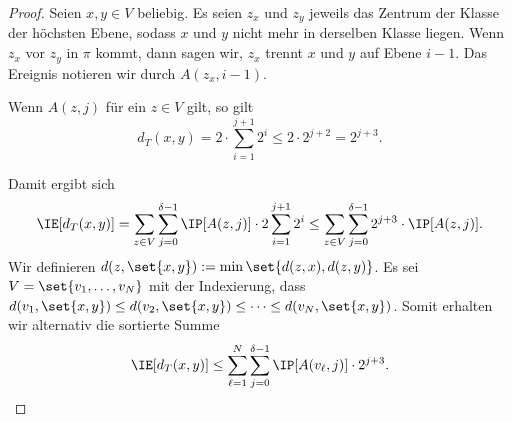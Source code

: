 \documentclass[language=ngerman,algolist]{TemplateLecture}
\begin{document}
\begin{proof}
    Seien $x, y \in V$ beliebig. Es seien $z_x$ und $z_y$ jeweils das Zentrum der Klasse der höchsten Ebene, sodass $x$ und $y$ nicht mehr in derselben Klasse liegen. Wenn $z_x$ vor $z_y$ in $\pi$ kommt, dann sagen wir, $z_x$ trennt $x$ und $y$ auf Ebene $i-1$. Das Ereignis notieren wir durch $A(z_x, i-1)$.

    Wenn $A(z, j)$ für ein $z \in V$ gilt, so gilt 
    \begin{equation*}
        d_T(x,y) = 2 \cdot \sum_{i = 1}^{j + 1} 2^i \leq 2 \cdot 2^{j+2} = 2^{j + 3}.
    \end{equation*}

    Damit ergibt sich 
    \begin{equation}
        \IE[d_T(x,y)] = \sum_{z \in V} \sum_{j = 0}^{\delta - 1} \IP[A(z, j)] \cdot 2\sum_{i = 1}^{j + 1} 2^i \leq \sum_{z \in V}\sum_{j = 0}^{\delta - 1}2^{j+3} \cdot \IP[A(z,j)]. \label{eq:hierPartFactor1}
    \end{equation}
    Wir definieren $d(z, \set{x,y}) := \min\set{d(z,x), d(z,y)}$. Es sei $V = \set{v_1, \ldots, v_N}$ mit der Indexierung, dass $d(v_1, \set{x,y}) \leq d(v_2, \set{x,y}) \leq \cdots \leq d(v_N, \set{x,y})$. Somit erhalten wir alternativ die sortierte Summe 
    \begin{equation}
        \IE[d_T(x,y)] \leq \sum_{\ell = 1}^N \sum_{j = 0}^{\delta - 1} \IP[A(v_\ell, j)] \cdot 2^{j+3}. \label{eq:hierPartFactor2}
    \end{equation}


\end{proof}
\end{document}
